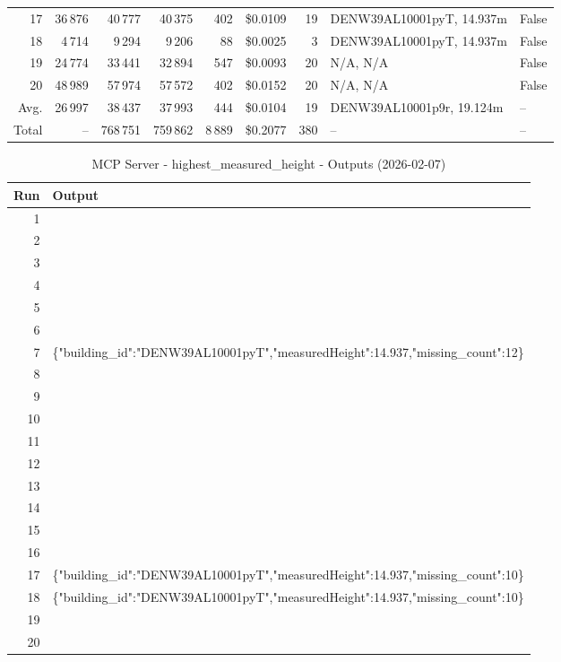 \documentclass[a4paper,11pt]{article}
\begin{document}
\begin{table}[ht]
\begin{tabular}{r r r r r r r p{3cm} l}
17 & 36\,876 & 40\,777 & 40\,375 & 402 & \$0.0109 & 19 & DENW39AL10001pyT, 14.937m & False \\
18 & 4\,714 & 9\,294 & 9\,206 & 88 & \$0.0025 & 3 & DENW39AL10001pyT, 14.937m & False \\
19 & 24\,774 & 33\,441 & 32\,894 & 547 & \$0.0093 & 20 & N/A, N/A & False \\
20 & 48\,989 & 57\,974 & 57\,572 & 402 & \$0.0152 & 20 & N/A, N/A & False \\
\hline
Avg. & 26\,997 & 38\,437 & 37\,993 & 444 & \$0.0104 & 19 & DENW39AL10001p9r, 19.124m & -- \\
Total & -- & 768\,751 & 759\,862 & 8\,889 & \$0.2077 & 380 & -- & -- \\
\hline
\end{tabular}
\end{table}

\clearpage

\begin{table}[ht]
\centering
\scriptsize
\caption{MCP Server - highest\_measured\_height - Outputs (2026-02-07)}
\label{tab:mcp\_highest\_measured\_height\_outputs\_2026-02-07}
\begin{tabular}{r p{12cm}}
\hline
Run & Output \\
\hline
1 &  \\
2 &  \\
3 &  \\
4 &  \\
5 &  \\
6 &  \\
7 & \{"building\_id":"DENW39AL10001pyT","measuredHeight":14.937,"missing\_count":12\} \\
8 &  \\
9 &  \\
10 &  \\
11 &  \\
12 &  \\
13 &  \\
14 &  \\
15 &  \\
16 &  \\
17 & \{"building\_id":"DENW39AL10001pyT","measuredHeight":14.937,"missing\_count":10\} \\
18 & \{"building\_id":"DENW39AL10001pyT","measuredHeight":14.937,"missing\_count":10\} \\
19 &  \\
20 &  \\
\hline
\end{tabular}
\end{table}
\end{document}
